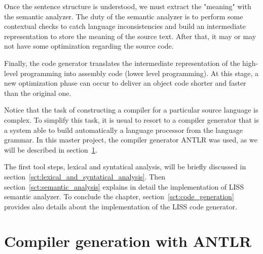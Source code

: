 \documentclass[
  oneside,
  11pt, a4paper,
  footinclude=true,
  headinclude=true,
  cleardoublepage=empty
]{scrbook}
\begin{document}


Once the sentence structure is understood, we must extract the "meaning" with the semantic analyzer.
The duty of the semantic analyzer is to perform some contextual checks to catch language inconsistencies and build an intermediate representation to store the meaning of the source text.
After that, it may or may not have some optimization regarding the source code.  

Finally, the code generator translates the intermediate representation of the high-level programming into assembly code (lower level programming).
At this stage, a new optimization phase can occur to deliver an object code shorter and faster than the original one.

Notice that the task of constructing a compiler for a particular source language is complex. 
To simplify this task, it is usual to resort to a compiler generator that is a system able to build automatically a language processor from the language grammar.
In this master project, the compiler generator ANTLR was used, as we will be described in section~\ref{sct:compiler_generation_with_antlr}.

The first tool steps, lexical and syntatical analysis, will be briefly discussed in section~\ref{sct:lexical_and_syntatical_analysis}. Then section~\ref{sct:semantic_analysis} explains in detail the implementation of LISS semantic analyzer.
To conclude the chapter, section~\ref{sct:code_generation} provides also details about the implementation of the LISS code generator.





\section{Compiler generation with ANTLR}
\label{sct:compiler_generation_with_antlr}
\end{document}
